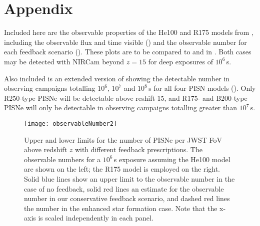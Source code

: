 \documentclass[../thesis.tex]{subfiles}
\begin{document}
\section{Appendix}
\label{appendix}
Included here are the observable properties of the He100 and R175 models from
\citet{KasenWoosleyHeger2011}, including the observable flux and time visible 
() and the observable number for each feedback scenario 
().  These plots are to be compared to
 and  in .  Both
cases may be detected with NIRCam beyond $z=15$ for deep exposures of
$10^6\,$s.

Also included is an extended version of  showing
the detectable number in observing campaigns totalling $10^6$, $10^7$
and $10^8\,$s for all four PISN models (). Only
R250-type PISNe will be detectable above reshift 15, and R175- and
B200-type PISNe will only be detectable in observing campaigns
totalling greater than $10^7\,$s.

\begin{figure}
 \begin{center}
   \texttt{[image: observableNumber2]}
   \caption{Upper and lower limits for the number of
     PISNe per JWST FoV above redshift $z$ with different feedback
     prescriptions. The observable numbers for a $10^6\,$s exposure
     assuming the He100 model are shown on the left; the R175 model is
     employed on the right. Solid blue lines show an upper limit
     to the observable number in the case of no feedback, solid red
     lines an estimate for the observable number in our conservative
     feedback scenario, and dashed red lines the number in the
     enhanced star formation case. Note that the x-axis is scaled
     independently in each panel.  }
   \label{obsnumber2}
 \end{center}
\end{figure} 
\end{document}
